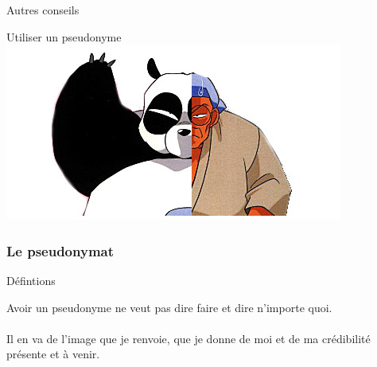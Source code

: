 \documentclass{beamer}
\begin{document}
\begin{frame}
\begin{center}
\Huge{Autres conseils }
\end{center}
\end{frame}

\begin{frame}
\begin{center}
\Huge{Utiliser un pseudonyme }
\includegraphics[scale=0.5] {./images/bannierepseudonymat.jpg}
\end{center}
\end{frame}

\begin{frame}
\frametitle{Le pseudonymat}

\begin{block}{Défintions}
\begin{itemize}
\end{itemize}
Avoir un pseudonyme ne veut pas dire faire et dire n'importe quoi.
\\~\\Il en va de l'image que je renvoie, que je donne de moi et de ma crédibilité présente et à venir.
\end{block}
\end{frame}
\end{document}
